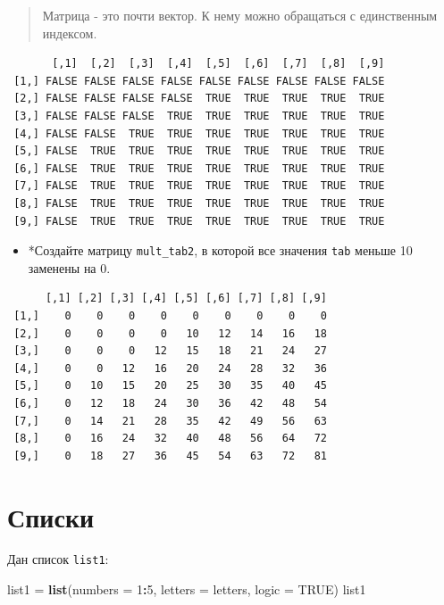 \documentclass[
]{book}
\newenvironment{Shaded}{\begin{snugshade}}{\end{snugshade}}
\newcommand{\DataTypeTok}[1]{\textcolor[rgb]{0.13,0.29,0.53}{#1}}
\newcommand{\DecValTok}[1]{\textcolor[rgb]{0.00,0.00,0.81}{#1}}
\newcommand{\KeywordTok}[1]{\textcolor[rgb]{0.13,0.29,0.53}{\textbf{#1}}}
\newcommand{\NormalTok}[1]{#1}
\newcommand{\OperatorTok}[1]{\textcolor[rgb]{0.81,0.36,0.00}{\textbf{#1}}}
\newcommand{\OtherTok}[1]{\textcolor[rgb]{0.56,0.35,0.01}{#1}}
\newcommand{\StringTok}[1]{\textcolor[rgb]{0.31,0.60,0.02}{#1}}
\providecommand{\tightlist}{%
  \setlength{\itemsep}{0pt}\setlength{\parskip}{0pt}}
\begin{document}
\begin{quote}
Матрица - это почти вектор. К нему можно обращаться с единственным индексом.
\end{quote}

\begin{verbatim}
       [,1]  [,2]  [,3]  [,4]  [,5]  [,6]  [,7]  [,8]  [,9]
 [1,] FALSE FALSE FALSE FALSE FALSE FALSE FALSE FALSE FALSE
 [2,] FALSE FALSE FALSE FALSE  TRUE  TRUE  TRUE  TRUE  TRUE
 [3,] FALSE FALSE FALSE  TRUE  TRUE  TRUE  TRUE  TRUE  TRUE
 [4,] FALSE FALSE  TRUE  TRUE  TRUE  TRUE  TRUE  TRUE  TRUE
 [5,] FALSE  TRUE  TRUE  TRUE  TRUE  TRUE  TRUE  TRUE  TRUE
 [6,] FALSE  TRUE  TRUE  TRUE  TRUE  TRUE  TRUE  TRUE  TRUE
 [7,] FALSE  TRUE  TRUE  TRUE  TRUE  TRUE  TRUE  TRUE  TRUE
 [8,] FALSE  TRUE  TRUE  TRUE  TRUE  TRUE  TRUE  TRUE  TRUE
 [9,] FALSE  TRUE  TRUE  TRUE  TRUE  TRUE  TRUE  TRUE  TRUE
\end{verbatim}

\begin{itemize}
\tightlist
\item
  *Создайте матрицу \texttt{mult\_tab2}, в которой все значения \texttt{tab} меньше 10 заменены на 0.
\end{itemize}

\begin{verbatim}
      [,1] [,2] [,3] [,4] [,5] [,6] [,7] [,8] [,9]
 [1,]    0    0    0    0    0    0    0    0    0
 [2,]    0    0    0    0   10   12   14   16   18
 [3,]    0    0    0   12   15   18   21   24   27
 [4,]    0    0   12   16   20   24   28   32   36
 [5,]    0   10   15   20   25   30   35   40   45
 [6,]    0   12   18   24   30   36   42   48   54
 [7,]    0   14   21   28   35   42   49   56   63
 [8,]    0   16   24   32   40   48   56   64   72
 [9,]    0   18   27   36   45   54   63   72   81
\end{verbatim}

\hypertarget{task_list}{%
\section{Списки}\label{task_list}}

Дан список \texttt{list1}:

\begin{Shaded}
\begin{Highlighting}[]
\NormalTok{list1 =}\StringTok{ }\KeywordTok{list}\NormalTok{(}\DataTypeTok{numbers =} \DecValTok{1}\OperatorTok{:}\DecValTok{5}\NormalTok{, }\DataTypeTok{letters =}\NormalTok{ letters, }\DataTypeTok{logic =} \OtherTok{TRUE}\NormalTok{)}
\NormalTok{list1}
\end{Highlighting}
\end{Shaded}
\end{document}
